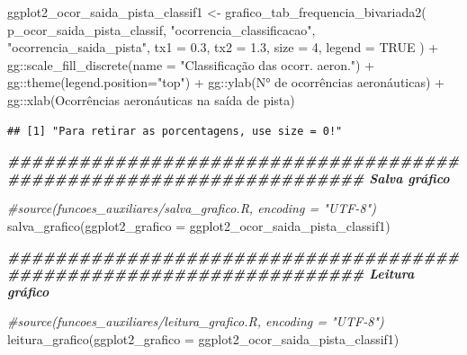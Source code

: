 \documentclass[
]{article}
\newenvironment{Shaded}{\begin{snugshade}}{\end{snugshade}}
\newcommand{\AttributeTok}[1]{\textcolor[rgb]{0.77,0.63,0.00}{#1}}
\newcommand{\CommentTok}[1]{\textcolor[rgb]{0.56,0.35,0.01}{\textit{#1}}}
\newcommand{\ConstantTok}[1]{\textcolor[rgb]{0.00,0.00,0.00}{#1}}
\newcommand{\DecValTok}[1]{\textcolor[rgb]{0.00,0.00,0.81}{#1}}
\newcommand{\DocumentationTok}[1]{\textcolor[rgb]{0.56,0.35,0.01}{\textbf{\textit{#1}}}}
\newcommand{\FloatTok}[1]{\textcolor[rgb]{0.00,0.00,0.81}{#1}}
\newcommand{\FunctionTok}[1]{\textcolor[rgb]{0.00,0.00,0.00}{#1}}
\newcommand{\NormalTok}[1]{#1}
\newcommand{\OtherTok}[1]{\textcolor[rgb]{0.56,0.35,0.01}{#1}}
\newcommand{\SpecialCharTok}[1]{\textcolor[rgb]{0.00,0.00,0.00}{#1}}
\newcommand{\StringTok}[1]{\textcolor[rgb]{0.31,0.60,0.02}{#1}}
\begin{document}
\begin{Shaded}
\begin{Highlighting}[]
\NormalTok{ggplot2\_ocor\_saida\_pista\_classif1 }\OtherTok{\textless{}{-}} \FunctionTok{grafico\_tab\_frequencia\_bivariada2}\NormalTok{(}
\NormalTok{    p\_ocor\_saida\_pista\_classif,}
    \StringTok{"ocorrencia\_classificacao"}\NormalTok{,}
    \StringTok{"ocorrencia\_saida\_pista"}\NormalTok{,}
    \AttributeTok{tx1 =} \FloatTok{0.3}\NormalTok{,}
    \AttributeTok{tx2 =} \FloatTok{1.3}\NormalTok{,}
    \AttributeTok{size =} \DecValTok{4}\NormalTok{,}
    \AttributeTok{legend =} \ConstantTok{TRUE}
\NormalTok{) }\SpecialCharTok{+}\NormalTok{ gg}\SpecialCharTok{::}\FunctionTok{scale\_fill\_discrete}\NormalTok{(}\AttributeTok{name =} \StringTok{"Classificação das ocorr. aeron."}\NormalTok{) }\SpecialCharTok{+}
\NormalTok{    gg}\SpecialCharTok{::}\FunctionTok{theme}\NormalTok{(}\AttributeTok{legend.position=}\StringTok{"top"}\NormalTok{) }\SpecialCharTok{+} 
\NormalTok{    gg}\SpecialCharTok{::}\FunctionTok{ylab}\NormalTok{(}\StringTok{\textquotesingle{}N° de ocorrências aeronáuticas\textquotesingle{}}\NormalTok{) }\SpecialCharTok{+}
\NormalTok{    gg}\SpecialCharTok{::}\FunctionTok{xlab}\NormalTok{(}\StringTok{\textquotesingle{}Ocorrências aeronáuticas na saída de pista\textquotesingle{}}\NormalTok{)}
\end{Highlighting}
\end{Shaded}

\begin{verbatim}
## [1] "Para retirar as porcentagens, use size = 0!"
\end{verbatim}

\begin{Shaded}
\begin{Highlighting}[]
\DocumentationTok{\#\#\#\#\#\#\#\#\#\#\#\#\#\#\#\#\#\#\#\#\#\#\#\#\#\#\#\#\#\#\#\#\#\#\#\#\#\#\#\#\#\#\#\#\#\#\#\#\#\#\#\#\#\#\#\#\#\#\#\#\#\#\#\#\#\#\#\# Salva gráfico}

\CommentTok{\#source(\textquotesingle{}funcoes\_auxiliares/salva\_grafico.R\textquotesingle{}, encoding = "UTF{-}8")}
\FunctionTok{salva\_grafico}\NormalTok{(}\AttributeTok{ggplot2\_grafico =}\NormalTok{ ggplot2\_ocor\_saida\_pista\_classif1)}

\DocumentationTok{\#\#\#\#\#\#\#\#\#\#\#\#\#\#\#\#\#\#\#\#\#\#\#\#\#\#\#\#\#\#\#\#\#\#\#\#\#\#\#\#\#\#\#\#\#\#\#\#\#\#\#\#\#\#\#\#\#\#\#\#\#\#\#\#\#\#\#\# Leitura gráfico}

\CommentTok{\#source(\textquotesingle{}funcoes\_auxiliares/leitura\_grafico.R\textquotesingle{}, encoding = "UTF{-}8")}
\FunctionTok{leitura\_grafico}\NormalTok{(}\AttributeTok{ggplot2\_grafico =}\NormalTok{ ggplot2\_ocor\_saida\_pista\_classif1)}
\end{Highlighting}
\end{Shaded}
\end{document}
